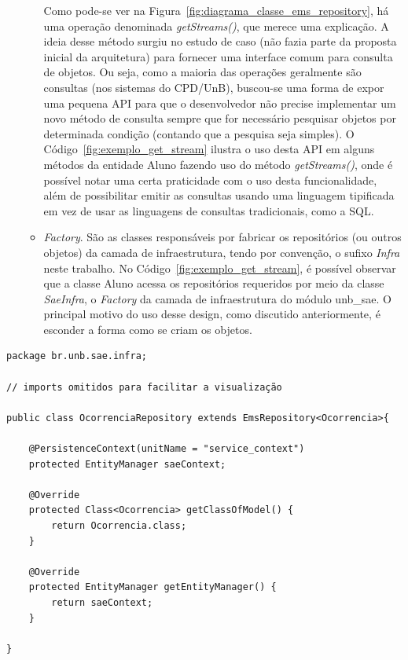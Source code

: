 \begin{itemize}
\begin{itemize}
			Como pode-se ver na Figura~\ref{fig:diagrama_classe_ems_repository},
			há uma operação denominada \textit{getStreams()}, 
			que	merece uma explicação. A ideia
			desse método surgiu 
			no estudo de caso (não fazia parte 
			da proposta inicial da arquitetura) 
			para
			fornecer uma 
			interface comum para 
			consulta de objetos.
			Ou seja,
			como a maioria das operações 
			geralmente são consultas (nos sistemas do CPD/UnB),
			buscou-se uma forma de expor uma 
			pequena \acrshort{API}
			para que o desenvolvedor não
			precise 
			implementar um novo método 
			de consulta sempre que for 
			necessário 
			pesquisar objetos por 
			determinada 
			condição (contando que a pesquisa seja simples).
			O Código~\ref{fig:exemplo_get_stream} ilustra o uso 
			desta \acrshort{API} em alguns
			métodos da entidade Aluno fazendo uso 
			do método \textit{getStreams()},
			onde é possível notar uma certa praticidade
			com o uso desta funcionalidade,
			além de possibilitar emitir as consultas
			usando uma linguagem tipificada
			em vez de usar as linguagens de consultas
			tradicionais, como a \acrfull{SQL}.
			
		
			\item \textit{Factory}. São as classes responsáveis
			por fabricar os 
			repositórios (ou outros objetos)
			da camada de infraestrutura, 
			tendo por convenção,
			o sufixo \emph{Infra} neste trabalho.
			No Código~\ref{fig:exemplo_get_stream},
			é possível observar 
			que a classe Aluno
			acessa os repositórios requeridos
			por meio da classe \emph{SaeInfra}, 
			o \textit{Factory} da camada de 
			infraestrutura
			do módulo unb\_sae. 
			O principal 
			motivo do uso desse design,
			como discutido anteriormente,
			é esconder a forma como se criam
			os objetos.
		
		\end{itemize}


\end{itemize}




             
\renewcommand{\lstlistingname}{Código}             
\begin{lstlisting}[caption=Exemplo de implementação do repositório QuestionarioRepository., label=fig:exemplo_repository]
package br.unb.sae.infra;

// imports omitidos para facilitar a visualização

public class OcorrenciaRepository extends EmsRepository<Ocorrencia>{
	
	@PersistenceContext(unitName = "service_context")
	protected EntityManager saeContext;
	
	@Override
	protected Class<Ocorrencia> getClassOfModel() {
		return Ocorrencia.class;
	}

	@Override
	protected EntityManager getEntityManager() {
		return saeContext;
	}

}
\end{lstlisting}


